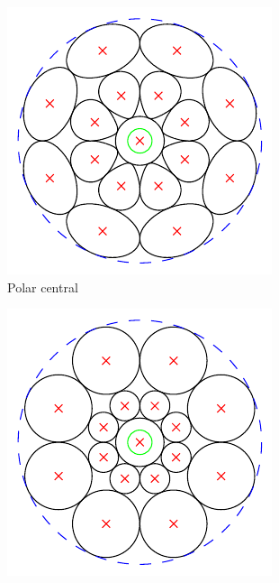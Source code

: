 \documentclass[thesis.tex]{subfiles}
\begin{document}
\begin{figure}[p]
\begin{subfigure}[t]{0.30\textwidth}
		\includegraphics[width=\textwidth]{img/gridType_polar_central_polar_gaussian.pdf}
		\caption{Polar central}
		\label{fig:gridTypePc}
	\end{subfigure}
	\begin{subfigure}[t]{0.30\textwidth}
		\includegraphics[width=\textwidth]{img/gridType_log-polar.pdf}

\end{subfigure}
\end{figure}
\end{document}
